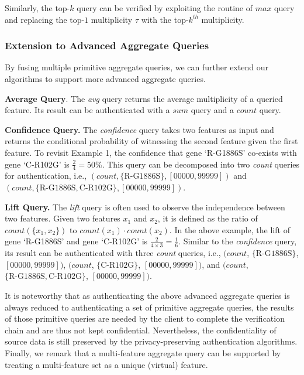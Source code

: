 Similarly, the top-$k$ query can be verified by exploiting the routine of $max$ query and replacing the top-$1$ multiplicity $\tau$ with the top-$k^{th}$ multiplicity. %

\subsubsection{Extension to Advanced Aggregate Queries}\label{sec:aggregate-queries:extension}

By fusing multiple primitive aggregate queries, we can further extend our algorithms to support more advanced aggregate queries.

\textbf{Average Query}. The \emph{avg} query returns the average multiplicity of a queried feature. Its result can be authenticated with a $sum$ query and a $count$ query.

\textbf{Confidence Query.} The \emph{confidence} query takes two features as input and returns the conditional probability of witnessing the second feature given the first feature. To revisit Example 1, the confidence that gene `R-G1886S' co-exists with gene `C-R102G' is $\frac{2}{4}=50$\%. This query can be decomposed into two \emph{count} queries for authentication, i.e.,  $(count,  \{\text{R-G1886S}\}, [00000, 99999])$ and $(count, \{\text{R-G1886S}, \text{C-R102G}\}, [00000, 99999])$.

\textbf{Lift Query.} The \emph{lift} query is often used to observe the independence between two features. Given two features $x_1$ and $x_2$, it is defined as the ratio of $count(\{x_1, x_2\})$ to $count({x_1}) \cdot count(x_2)$. In the above example, the lift of gene `R-G1886S' and gene `C-R102G' is $\frac{2}{4 \times 3}=\frac{1}{6}$. Similar to the \emph{confidence} query, its result can be authenticated with three \emph{count} queries, i.e., $(count$, $\{\text{R-G1886S}\}$, $[00000, 99999])$, $(count$, $\{\text{C-R102G}\}$, $[00000, 99999])$, and $(count$, $\{\text{R-G1886S}, \text{C-R102G}\}$, $[00000, 99999])$.

It is noteworthy that as authenticating the above advanced aggregate queries is always reduced to authenticating a set of primitive aggregate queries, the results of those primitive queries are needed by the client to complete the verification chain and are thus not kept confidential. Nevertheless, the confidentiality of source data is still preserved by the privacy-preserving authentication algorithms. Finally, we remark that a multi-feature aggregate query can be supported by treating a multi-feature set as a unique (virtual) feature.

